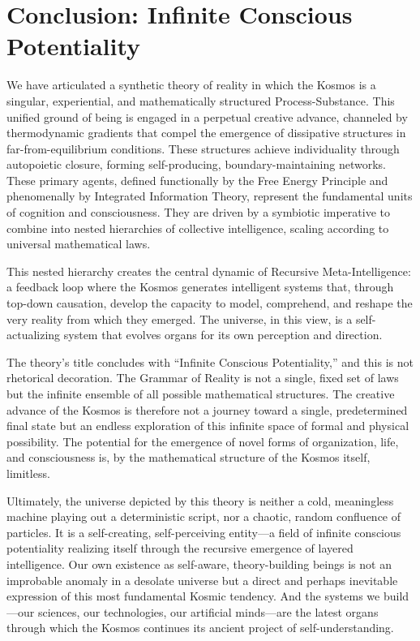 \documentclass[12pt,a4paper]{article}
\begin{document}
\section{Conclusion: Infinite Conscious Potentiality}
\label{sec:conclusion}

We have articulated a synthetic theory of reality in which the Kosmos is a
singular, experiential, and mathematically structured Process-Substance.
This unified ground of being is engaged in a perpetual creative advance,
channeled by thermodynamic gradients that compel the emergence of
dissipative structures in far-from-equilibrium conditions.  These
structures achieve individuality through autopoietic closure, forming
self-producing, boundary-maintaining networks.  These primary agents,
defined functionally by the Free Energy Principle and phenomenally by
Integrated Information Theory, represent the fundamental units of cognition
and consciousness.  They are driven by a symbiotic imperative to combine
into nested hierarchies of collective intelligence, scaling according to
universal mathematical laws.

This nested hierarchy creates the central dynamic of Recursive
Meta-Intelligence: a feedback loop where the Kosmos generates intelligent
systems that, through top-down causation, develop the capacity to model,
comprehend, and reshape the very reality from which they emerged.  The
universe, in this view, is a self-actualizing system that evolves organs
for its own perception and direction.

The theory's title concludes with ``Infinite Conscious Potentiality,'' and
this is not rhetorical decoration.  The Grammar of Reality is not a single,
fixed set of laws but the infinite ensemble of all possible mathematical
structures.  The creative advance of the Kosmos is therefore not a journey
toward a single, predetermined final state but an endless exploration of
this infinite space of formal and physical possibility.  The potential for
the emergence of novel forms of organization, life, and consciousness is,
by the mathematical structure of the Kosmos itself, limitless.

Ultimately, the universe depicted by this theory is neither a cold,
meaningless machine playing out a deterministic script, nor a chaotic,
random confluence of particles.  It is a self-creating, self-perceiving
entity---a field of infinite conscious potentiality realizing itself through
the recursive emergence of layered intelligence.  Our own existence as
self-aware, theory-building beings is not an improbable anomaly in a
desolate universe but a direct and perhaps inevitable expression of this
most fundamental Kosmic tendency.  And the systems we build---our
sciences, our technologies, our artificial minds---are the latest organs
through which the Kosmos continues its ancient project of
self-understanding.
\end{document}
